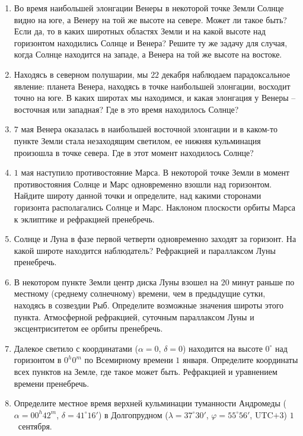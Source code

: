 \documentclass[12pt]{article}
\begin{document}
\begin{enumerate}
    \item Во время наибольшей элонгации Венеры в некоторой точке Земли Солнце видно на юге, а Венеру на той же высоте на севере. Может ли такое быть? Если да, то в каких широтных областях Земли и на какой высоте над горизонтом находились Солнце и Венера? Решите ту же задачу для случая, когда Солнце находится на западе, а Венера на той же высоте на востоке.
    \item Находясь в северном полушарии, мы $22$ декабря наблюдаем парадоксальное явление: планета Венера, находясь в точке наибольшей элонгации, восходит точно на юге. В каких широтах мы находимся, и какая элонгация у Венеры – восточная или западная? Где в это время находилось Солнце?
    \item $7$ мая Венера оказалась в наибольшей восточной элонгации и в каком-то пункте Земли стала незаходящим светилом, ее нижняя кульминация произошла в точке севера. Где в этот момент находилось Солнце?
    \item $1$ мая наступило противостояние Марса. В некоторой точке Земли в момент противостояния Солнце и Марс одновременно взошли над горизонтом. Найдите широту данной точки и определите, над какими сторонами горизонта располагались Солнце и Марс. Наклоном плоскости орбиты Марса к эклиптике и рефракцией пренебречь.
    \item Солнце и Луна в фазе первой четверти одновременно заходят за горизонт. На какой	широте находится наблюдатель? Рефракцией и параллаксом Луны пренебречь.
    \item В некотором пункте Земли центр диска Луны взошел на $20$ минут раньше по местному (среднему солнечному) времени, чем в предыдущие сутки, находясь в созвездии Рыб. Определите возможные значения широты этого пункта. Атмосферной рефракцией, суточным параллаксом Луны и эксцентриситетом ее орбиты пренебречь. 
    \item Далекое светило с координатами ($\alpha=0$, $\delta=0$) находится на высоте $0^{\circ}$ над горизонтом в $0^h0^m$ по Всемирному времени $1$ января. Определите координаты всех пунктов на Земле, где такое может быть. Рефракцией и уравнением времени пренебречь. 
    \item Определите местное время верхней кульминации туманности Андромеды ($\alpha=00^h 42^m$, $\delta=41^{\circ}16'$) в Долгопрудном ($\lambda=37^{\circ}30'$, $\varphi=55^{\circ}56'$, UTC$+3$) $1$~сентября. 
\end{enumerate}
\end{document}
